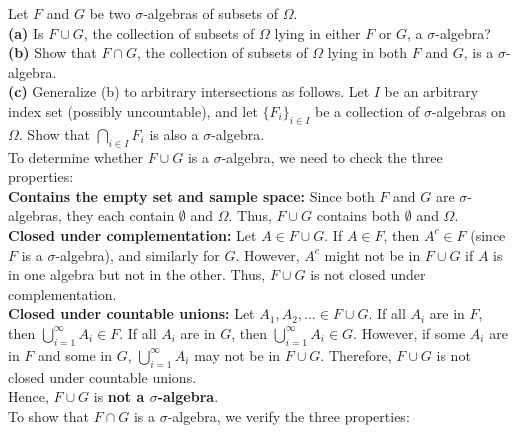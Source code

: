 \begin{example}
    Let \( F \) and \( G \) be two \(\sigma\)-algebras of subsets of \(\Omega\). \\
    \textbf{(a)} Is \( F \cup G \), the collection of subsets of \(\Omega\) lying in either \( F \) or \( G \), a \(\sigma\)-algebra?\\
    \textbf{(b)} Show that \( F \cap G \), the collection of subsets of \(\Omega\) lying in both \( F \) and \( G \), is a \(\sigma\)-algebra.\\
    \textbf{(c)} Generalize (b) to arbitrary intersections as follows. Let \( I \) be an arbitrary index set (possibly uncountable), and let \( \{F_i\}_{i \in I} \) be a collection of \(\sigma\)-algebras on \(\Omega\). Show that \( \bigcap_{i \in I} F_i \) is also a \(\sigma\)-algebra. \\

To determine whether \( F \cup G \) is a \(\sigma\)-algebra, we need to check the three properties:\\

\textbf{Contains the empty set and sample space:} Since both \( F \) and \( G \) are \(\sigma\)-algebras, they each contain \( \emptyset \) and \( \Omega \). Thus, \( F \cup G \) contains both \( \emptyset \) and \( \Omega \).\\
    
\textbf{Closed under complementation:} Let \( A \in F \cup G \). If \( A \in F \), then \( A^c \in F \) (since \( F \) is a \(\sigma\)-algebra), and similarly for \( G \). However, \( A^c \) might not be in \( F \cup G \) if \( A \) is in one algebra but not in the other. Thus, \( F \cup G \) is not closed under complementation.\\

\textbf{Closed under countable unions:} Let \( A_1, A_2, \ldots \in F \cup G \). If all \( A_i \) are in \( F \), then \( \bigcup_{i=1}^\infty A_i \in F \). If all \( A_i \) are in \( G \), then \( \bigcup_{i=1}^\infty A_i \in G \). However, if some \( A_i \) are in \( F \) and some in \( G \), \( \bigcup_{i=1}^\infty A_i \) may not be in \( F \cup G \). Therefore, \( F \cup G \) is not closed under countable unions.\\

Hence, \( F \cup G \) is \textbf{not a \(\sigma\)-algebra}.\\

To show that \( F \cap G \) is a \(\sigma\)-algebra, we verify the three properties:\\


\end{example}

